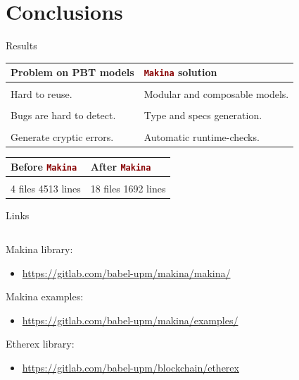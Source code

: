 \documentclass[aspectratio=169, 10pt]{beamer}
\begin{document}
\section{Conclusions}
\label{sec:org0b609be}
\begin{frame}[label={sec:org7d49b79},fragile]{Results}
 \onslide<+->
\onslide<+->

\begin{center}
\begin{tabular}{ll}
Problem on PBT models & \lstinline[language=elixir, style=display]~Makina~ solution\\
\hline
 & \\
Hard to reuse. & Modular and composable models.\\
 & \\
Bugs are hard to detect. & Type and specs generation.\\
 & \\
Generate cryptic errors. & Automatic runtime-checks.\\
\end{tabular}
\end{center}

\vspace{10pt}

\onslide<+->

\begin{center}
\begin{tabular}{ll}
Before \lstinline[language=elixir, style=display]~Makina~ & After \lstinline[language=elixir, style=display]~Makina~\\
\hline
 & \\
4 files 4513 lines & 18 files 1692 lines\\
\end{tabular}
\end{center}
\end{frame}

\begin{frame}[label={sec:org47f3ce3}]{Links}
\begin{columns}
\begin{column}{0.78\columnwidth}
Makina library:
\begin{itemize}
\item \url{https://gitlab.com/babel-upm/makina/makina/}
\end{itemize}
\vspace{10pt}
Makina examples:
\begin{itemize}
\item \url{https://gitlab.com/babel-upm/makina/examples/}
\end{itemize}
\vspace{10pt}
Etherex library:
\begin{itemize}
\item \url{https://gitlab.com/babel-upm/blockchain/etherex}
\end{itemize}
\vspace{10pt}
\end{column}
\end{columns}
\end{frame}
\end{document}

